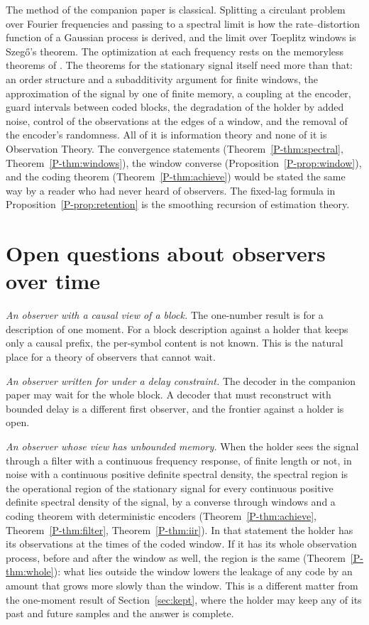 \documentclass[11pt]{article}
\newcommand{\Th}[1]{Theorem~\ref{P-#1}}
\newcommand{\Pp}[1]{Proposition~\ref{P-#1}}
\begin{document}
The method of the companion paper is classical. Splitting a circulant
problem over Fourier frequencies and passing to a spectral limit is how
the rate--distortion function of a Gaussian process is derived, and the
limit over Toeplitz windows is Szeg\H{o}'s theorem. The optimization
at each frequency rests on the memoryless theorems of \cite{paper1}.
The theorems for the stationary signal itself need more than that: an
order structure and a subadditivity argument for finite windows, the
approximation of the signal by one of finite memory, a coupling at the
encoder, guard intervals between coded blocks, the degradation of the
holder by added noise, control of the observations at the edges of a
window, and the removal of the encoder's randomness. All of it is
information theory and none of it is Observation Theory. The
convergence statements (\Th{thm:spectral},
\Th{thm:windows}), the window converse (\Pp{prop:window}), and the
coding theorem (\Th{thm:achieve}) would be stated the same way
by a reader who had never heard of observers. The fixed-lag formula in
\Pp{prop:retention} is the smoothing recursion of estimation theory.

\section{Open questions about observers over time}
\label{sec:open}

\emph{An observer with a causal view of a block.} The one-number result
is for a description of one moment. For a block description against a
holder that keeps only a causal prefix, the per-symbol content is not
known. This is the natural place for a theory of observers that cannot
wait.

\emph{An observer written for under a delay constraint.} The decoder in
the companion paper may wait for the whole block. A decoder that must
reconstruct with bounded delay is a different first observer, and the
frontier against a holder is open.

\emph{An observer whose view has unbounded memory.} When the holder
sees the signal through a filter with a continuous frequency response,
of finite length or not, in noise with a
continuous positive definite spectral density, the spectral region is
the operational region of the stationary signal for every continuous
positive definite spectral density of the signal, by a converse
through windows and a coding theorem with deterministic encoders
(\Th{thm:achieve}, \Th{thm:filter}, \Th{thm:iir}). In that statement the holder has
its observations at the times of the coded window. If it has its whole
observation process, before and after the window as well, the region
is the same (\Th{thm:whole}): what lies outside the window lowers the
leakage of any code by an amount that grows more slowly than the
window. This is a
different matter from the one-moment result of
Section~\ref{sec:kept}, where the holder may keep any of its past and
future samples and the answer is complete.
\end{document}
